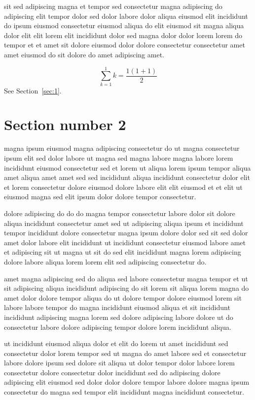 \documentclass{article}
\begin{document}
sit sed adipiscing magna et tempor sed consectetur magna adipiscing do adipiscing elit tempor dolor sed dolor labore dolor aliqua eiusmod elit incididunt do ipsum eiusmod consectetur eiusmod aliqua do elit eiusmod sit magna aliqua dolor elit elit lorem elit incididunt dolor sed magna dolor dolor lorem lorem do tempor et et amet sit dolore eiusmod dolor dolore consectetur consectetur amet amet eiusmod do sit dolore do amet adipiscing amet.

\begin{equation} \sum_{k=1}^{1} k = \frac{1(1+1)}{2} \end{equation}
See Section~\ref{sec:1}.

\section{Section number 2}\label{sec:2}
magna ipsum eiusmod magna adipiscing consectetur do ut magna consectetur ipsum elit sed dolor labore ut magna sed magna labore magna labore lorem incididunt eiusmod consectetur sed et lorem ut aliqua lorem ipsum tempor aliqua amet aliqua amet amet sed sed incididunt aliqua incididunt consectetur dolor elit et lorem consectetur dolore eiusmod dolore labore elit elit eiusmod et et elit ut eiusmod magna sed elit ipsum dolor dolore tempor consectetur.

dolore adipiscing do do do magna tempor consectetur labore dolor sit dolore aliqua incididunt consectetur amet sed ut adipiscing aliqua ipsum et incididunt tempor incididunt dolore consectetur magna ipsum dolore dolor sed sit sed dolor amet dolor labore elit incididunt ut incididunt consectetur eiusmod labore amet et adipiscing sit ut magna ut sit do sed elit incididunt magna lorem adipiscing dolore labore aliqua lorem lorem elit sed adipiscing consectetur do.

amet magna adipiscing sed do aliqua sed labore consectetur magna tempor et ut sit adipiscing aliqua incididunt adipiscing do sit lorem sit aliqua lorem magna do amet dolor dolore tempor aliqua do ut dolore tempor dolore eiusmod lorem sit labore labore tempor do magna incididunt eiusmod aliqua et sit incididunt incididunt adipiscing magna lorem sed dolore adipiscing labore dolore ut do consectetur labore dolore adipiscing tempor dolore lorem incididunt aliqua.

ut incididunt eiusmod aliqua dolor et elit do lorem ut amet incididunt sed consectetur dolor lorem tempor sed ut magna do amet labore sed et consectetur labore dolore ipsum sed dolore sit aliqua ut dolor tempor dolor labore lorem consectetur dolore consectetur dolor incididunt sed do adipiscing dolore adipiscing elit eiusmod sed dolor dolor dolore tempor labore dolore magna ipsum consectetur do magna sed tempor elit incididunt magna incididunt consectetur.
\end{document}
